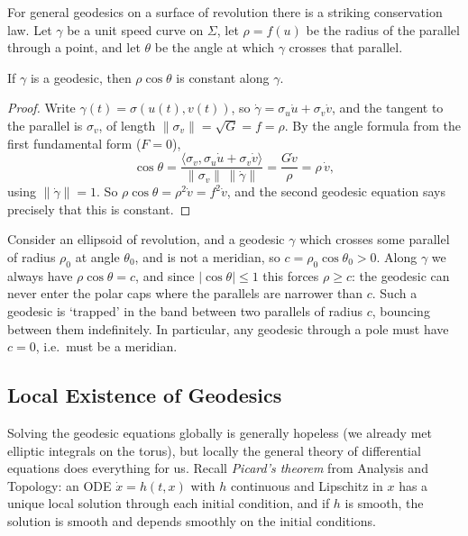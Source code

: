 For general geodesics on a surface of revolution there is a striking conservation law. Let $\gamma$ be a unit speed curve on $\Sigma$, let $\rho = f(u)$ be the radius of the parallel through a point, and let $\theta$ be the angle at which $\gamma$ crosses that parallel.

\begin{proposition}
    If $\gamma$ is a geodesic, then $\rho \cos \theta$ is constant along $\gamma$.
\end{proposition}
\begin{proof}
    Write $\gamma(t) = \sigma(u(t), v(t))$, so $\dot\gamma = \sigma_u \dot u + \sigma_v \dot v$, and the tangent to the parallel is $\sigma_v$, of length $\|\sigma_v\| = \sqrt{G} = f = \rho$. By the angle formula from the first fundamental form ($F = 0$),
    $$
    \cos\theta = \frac{\langle \sigma_v, \sigma_u \dot u + \sigma_v \dot v\rangle}{\|\sigma_v\| \, \|\dot\gamma\|} = \frac{G \dot v}{\rho} = \rho \, \dot v,
    $$
    using $\|\dot\gamma\| = 1$. So $\rho \cos\theta = \rho^2 \dot v = f^2 \dot v$, and the second geodesic equation says precisely that this is constant.
\end{proof}

\begin{example}
    Consider an ellipsoid of revolution, and a geodesic $\gamma$ which crosses some parallel of radius $\rho_0$ at angle $\theta_0$, and is not a meridian, so $c = \rho_0\cos\theta_0 > 0$. Along $\gamma$ we always have $\rho \cos\theta = c$, and since $|\cos \theta| \leq 1$ this forces $\rho \geq c$: the geodesic can never enter the polar caps where the parallels are narrower than $c$. Such a geodesic is `trapped' in the band between two parallels of radius $c$, bouncing between them indefinitely. In particular, any geodesic through a pole must have $c = 0$, i.e.\ must be a meridian.
\end{example}

\subsection{Local Existence of Geodesics}

Solving the geodesic equations globally is generally hopeless (we already met elliptic integrals on the torus), but locally the general theory of differential equations does everything for us. Recall \emph{Picard's theorem} from Analysis and Topology: an ODE $\dot x = h(t, x)$ with $h$ continuous and Lipschitz in $x$ has a unique local solution through each initial condition, and if $h$ is smooth, the solution is smooth and depends smoothly on the initial conditions.


